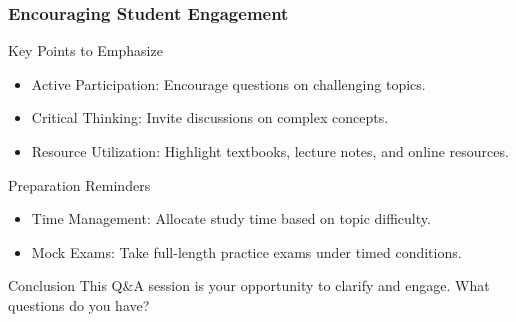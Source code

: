 \documentclass{beamer}
\begin{document}
\begin{frame}[fragile]
    \frametitle{Encouraging Student Engagement}
    \begin{block}{Key Points to Emphasize}
        \begin{itemize}
            \item Active Participation: Encourage questions on challenging topics.
            \item Critical Thinking: Invite discussions on complex concepts.
            \item Resource Utilization: Highlight textbooks, lecture notes, and online resources.
        \end{itemize}
    \end{block}
    \begin{block}{Preparation Reminders}
        \begin{itemize}
            \item Time Management: Allocate study time based on topic difficulty.
            \item Mock Exams: Take full-length practice exams under timed conditions.
        \end{itemize}
    \end{block}
    \begin{block}{Conclusion}
        This Q\&A session is your opportunity to clarify and engage. What questions do you have?
    \end{block}
\end{frame}
\end{document}
